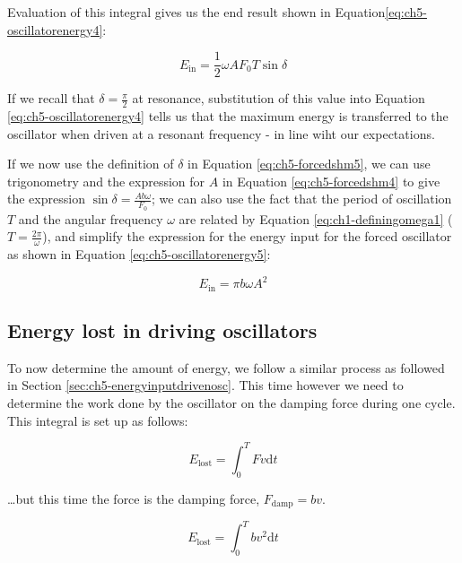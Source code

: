 \documentclass[
]{book}
\begin{document}
Evaluation of this integral gives us the end result shown in Equation\eqref{eq:ch5-oscillatorenergy4}:

\begin{equation}
E_{\mathrm{in}} = \frac{1}{2}\omega A F_0 T \sin \delta
\label{eq:ch5-oscillatorenergy4}
\end{equation}

If we recall that \(\delta = \frac{\pi}{2}\) at resonance, substitution of this value into Equation \eqref{eq:ch5-oscillatorenergy4} tells us that the maximum energy is transferred to the oscillator when driven at a resonant frequency - in line wiht our expectations.

If we now use the definition of \(\delta\) in Equation \eqref{eq:ch5-forcedshm5}, we can use trigonometry and the expression for \(A\) in Equation \eqref{eq:ch5-forcedshm4} to give the expression \(\sin \delta = \frac{Ab\omega}{F_0}\); we can also use the fact that the period of oscillation \(T\) and the angular frequency \(\omega\) are related by Equation \eqref{eq:ch1-definingomega1} (\(T = \frac{2\pi}{\omega}\)), and simplify the expression for the energy input for the forced oscillator as shown in Equation \eqref{eq:ch5-oscillatorenergy5}:

\begin{equation}
E_{\mathrm{in}} = \pi b \omega A^2
\label{eq:ch5-oscillatorenergy5}
\end{equation}

\hypertarget{sec:ch5-energylostdrivenosc}{%
\subsection{Energy lost in driving oscillators}\label{sec:ch5-energylostdrivenosc}}

To now determine the amount of energy, we follow a similar process as followed in Section \ref{sec:ch5-energyinputdrivenosc}. This time however we need to determine the work done by the oscillator on the damping force during one cycle. This integral is set up as follows:

\begin{equation}
E_{\mathrm{lost}} = \int_0^T F v \mathrm{d}t
\end{equation}

\ldots but this time the force is the damping force, \(F_{\mathrm{damp}} = bv\).

\begin{equation}
E_{\mathrm{lost}} = \int_0^T b v^2 \mathrm{d}t
\end{equation}
\end{document}

